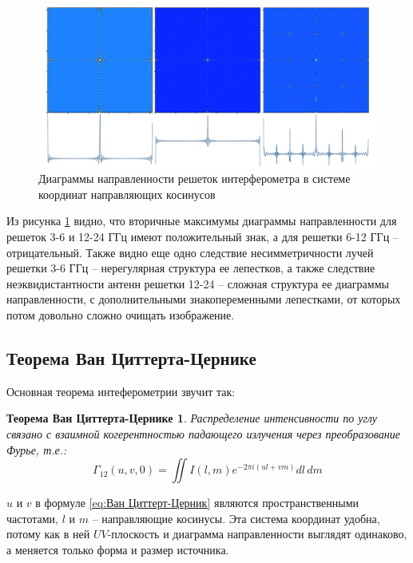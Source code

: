 \begin{figure}[H]
	\centering
	\includegraphics[scale=0.43]{images/psfs}
	\caption{Диаграммы направленности решеток интерферометра в системе координат направляющих косинусов}
	\label{fig:psfs}
\end{figure}

Из рисунка \ref{fig:psfs} видно, что вторичные максимумы диаграммы направленности для решеток 3-6 и 12-24 ГГц имеют положительный знак, а для решетки 6-12 ГГц -- отрицательный. Также видно еще одно следствие несимметричности лучей решетки 3-6 ГГц -- нерегулярная структура ее лепестков, а также следствие неэквидистантности антенн решетки 12-24 -- сложная структура ее диаграммы направленности, с дополнительными знакопеременными лепестками, от которых потом довольно сложно очищать изображение.

\subsection{Теорема Ван Циттерта-Цернике}
Основная теорема интеферометрии звучит так:
\newtheorem*{Van_Cittert_Zernike}{Теорема Ван Циттерта-Цернике}
\begin{Van_Cittert_Zernike}
Распределение интенсивности по углу связано с взаимной когерентностью падающего излучения через преобразование Фурье, т.е.:
\begin{equation}\label{eq:Ван Циттерт-Церник}
	\Gamma_{12} (u,v,0) = \iint I(l,m) e^{-2\pi i(ul+vm)} dl \, dm
\end{equation}
\end{Van_Cittert_Zernike}
\noindent $u$ и $v$ в формуле \ref{eq:Ван Циттерт-Церник} являются пространственными частотами, $l$ и $m$ -- направляющие косинусы. Эта система координат удобна, потому как в ней $UV$-плоскость и диаграмма направленности выглядят одинаково, а меняется только форма и размер источника.

